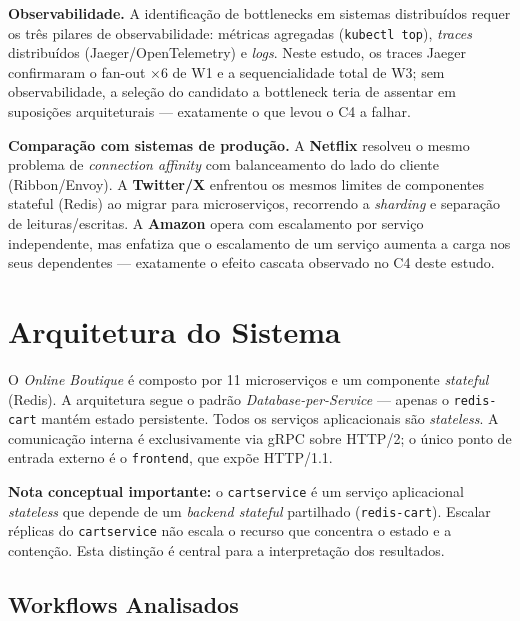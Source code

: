 \documentclass[acmsmall,screen=true,nonacm]{acmart}
\begin{document}
\textbf{Observabilidade.} A identificação de bottlenecks em sistemas distribuídos requer os três pilares de observabilidade: métricas agregadas (\texttt{kubectl top}), \textit{traces} distribuídos (Jaeger/OpenTelemetry) e \textit{logs}. Neste estudo, os traces Jaeger confirmaram o fan-out ×6 de W1 e a sequencialidade total de W3; sem observabilidade, a seleção do candidato a bottleneck teria de assentar em suposições arquiteturais — exatamente o que levou o C4 a falhar.

\textbf{Comparação com sistemas de produção.} A \textbf{Netflix} resolveu o mesmo problema de \textit{connection affinity} com balanceamento do lado do cliente (Ribbon/Envoy). A \textbf{Twitter/X} enfrentou os mesmos limites de componentes stateful (Redis) ao migrar para microserviços, recorrendo a \textit{sharding} e separação de leituras/escritas. A \textbf{Amazon} opera com escalamento por serviço independente, mas enfatiza que o escalamento de um serviço aumenta a carga nos seus dependentes — exatamente o efeito cascata observado no C4 deste estudo.

\section{Arquitetura do Sistema}

O \textit{Online Boutique} é composto por 11 microserviços e um componente \textit{stateful} (Redis). A arquitetura segue o padrão \textit{Database-per-Service} — apenas o \texttt{redis-cart} mantém estado persistente. Todos os serviços aplicacionais são \textit{stateless}. A comunicação interna é exclusivamente via gRPC sobre HTTP/2; o único ponto de entrada externo é o \texttt{frontend}, que expõe HTTP/1.1.

\textbf{Nota conceptual importante:} o \texttt{cartservice} é um serviço aplicacional \textit{stateless} que depende de um \textit{backend stateful} partilhado (\texttt{redis-cart}). Escalar réplicas do \texttt{cartservice} não escala o recurso que concentra o estado e a contenção. Esta distinção é central para a interpretação dos resultados.


\subsection{Workflows Analisados}
\end{document}
